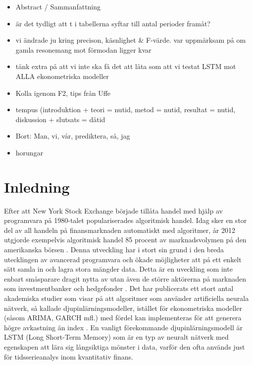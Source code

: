 \documentclass[11pt]{article}
\numberwithin{equation}{section}
\numberwithin{table}{section}
\numberwithin{figure}{section}
\begin{document}
\newpage
\thispagestyle{empty}

\begin{itemize}
    \item Abstract / Sammanfattning
    \item är det tydligt att t i tabellerna syftar till antal perioder framåt?
    \item vi ändrade ju kring precison, käsnlighet \& F-värde. var uppmärksam på om gamla resonemang mot förmodan ligger kvar
    \item tänk extra på att vi inte ska få det att låta som att vi testat LSTM mot ALLA ekonometriska modeller
    \item Kolla igenom F2, tips från Uffe
    
    \item tempus (introduktion + teori = nutid, metod = nutid, resultat = nutid,  diskussion + slutsats = dåtid
    \item Bort: Man, vi, vår, prediktera, så, jag
    \item horungar
\end{itemize}

\newpage
\clearpage
\setcounter{page}{1}


\section{Inledning}
Efter att New York Stock Exchange började tillåta handel med hjälp av programvara på 1980-talet populariserades algoritmisk handel.  Idag sker en stor del av all handeln på finansmarknaden automatiskt med algoritmer, år 2012 utgjorde exempelvis algoritmisk handel 85 procent av marknadsvolymen på den amerikanska börsen \parencite[][,s.258]{glantz2013multi}. Denna utveckling har i stort sin grund i den breda utecklingen av avancerad programvara och ökade möjligheter att på ett enkelt sätt samla in och lagra stora mängder data. Detta är en uveckling som inte enbart småsparare dragit nytta av utan även de större aktörerna på marknaden som investmentbanker och hedgefonder \parencite{DE_Shaw}. Det har publicerats ett stort antal akademiska studier som visar på att algoritmer som använder artificiella neurala nätverk, så kallade djupinlärningsmodeller, istället för ekonometriska modeller (såsom ARIMA, GARCH mfl.) med fördel kan implementeras för att generera högre avkastning än index \parencite{paliwal2009neural}. En vanligt förekommande djupinlärningsmodell är LSTM (Long Short-Term Memory) som är en typ av neuralt nätverk med egenskapen att lära sig långsiktiga mönster i data, varför den ofta används just för tidsserieanalys inom kvantitativ finans.
\end{document}
